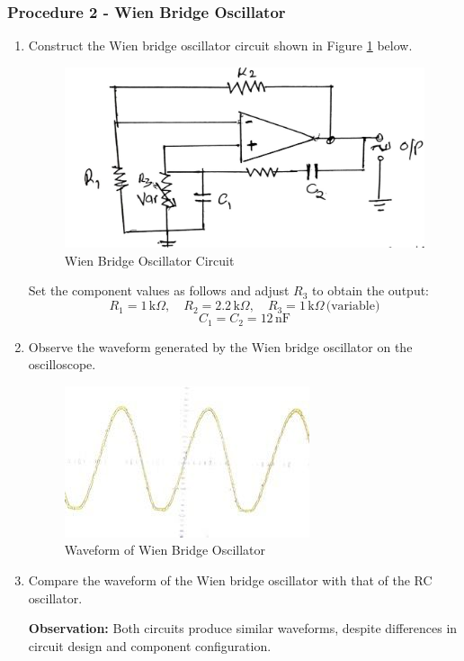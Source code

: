 \documentclass[12pt,a4paper]{article}
\begin{document}
    \subsubsection{Procedure 2 - Wien Bridge Oscillator}

    \begin{enumerate}
        \item Construct the Wien bridge oscillator circuit shown in Figure \ref{fig:2} below.
        \begin{figure}[H]
            \centering
            \includegraphics[width=0.5\linewidth]{circuit2_2.jpeg}
            \caption{Wien Bridge Oscillator Circuit}
            \label{fig:2}
        \end{figure}
        
        Set the component values as follows and adjust \( R_3 \) to obtain the output:
        \[
        R_1 = 1 \, \text{k} \Omega, \quad R_2 = 2.2 \, \text{k} \Omega, \quad R_3 = 1 \, \text{k} \Omega \, \text{(variable)}
        \]
        \[
        C_1 = C_2 = 12 \, \text{nF}
        \]
        
        \item Observe the waveform generated by the Wien bridge oscillator on the oscilloscope.
        \begin{figure}[H]
            \centering
            \includegraphics[width=0.5\linewidth]{2.jpeg}
            \caption{Waveform of Wien Bridge Oscillator}
            \label{fig:enter-label}
        \end{figure}
        
        \item Compare the waveform of the Wien bridge oscillator with that of the RC oscillator.

        \textbf{Observation:} Both circuits produce similar waveforms, despite differences in circuit design and component configuration.
    \end{enumerate}
\end{document}
